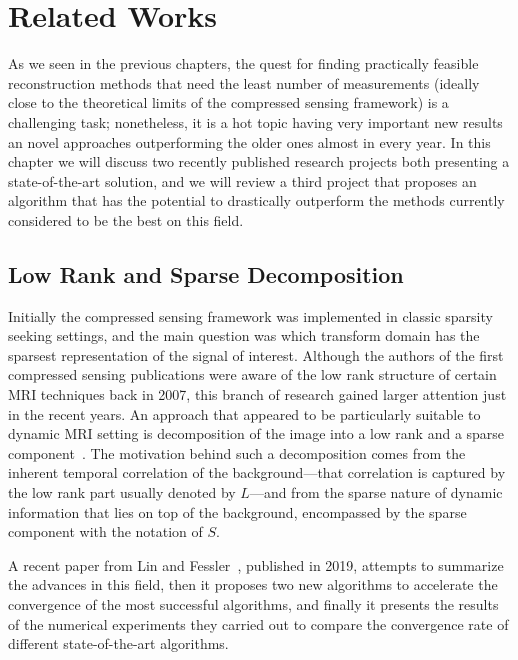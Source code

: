 \chapter{Related Works}

As we seen in the previous chapters, the quest for finding practically feasible reconstruction methods that need the least number of measurements (ideally close to the theoretical limits of the compressed sensing framework) is a challenging task; nonetheless, it is a hot topic having very important new results an novel approaches outperforming the older ones almost in every year. In this chapter we will discuss two recently published research projects both presenting a state-of-the-art solution, and we will review a third project that proposes an algorithm that has the potential to drastically outperform the methods currently considered to be the best on this field.

\section{Low Rank and Sparse Decomposition}

Initially the compressed sensing framework was implemented in classic sparsity seeking settings, and the main question was which transform domain has the sparsest representation of the signal of interest. Although the authors of the first compressed sensing publications were aware of the low rank structure of certain MRI techniques back in 2007, this branch of research gained larger attention just in the recent years. An approach that appeared to be particularly suitable to dynamic MRI setting is decomposition of the image into a low rank and a sparse component~\cite{lingala_accelerated_2011, tremoulheac_dynamic_2014, otazo_low-rank_2015, roohi_multi-dimensional_2017}. The motivation behind such a decomposition comes from the inherent temporal correlation of the background---that correlation is captured by the low rank part usually denoted by $L$---and from the sparse nature of dynamic information that lies on top of the background, encompassed by the sparse component with the notation of $S$.

A recent paper from Lin and Fessler~\cite{lin_efficient_2019}, published in 2019, attempts to summarize the advances in this field, then it proposes two new algorithms to accelerate the convergence of the most successful algorithms, and finally it presents the results of the numerical experiments they carried out to compare the convergence rate of different state-of-the-art algorithms.  

